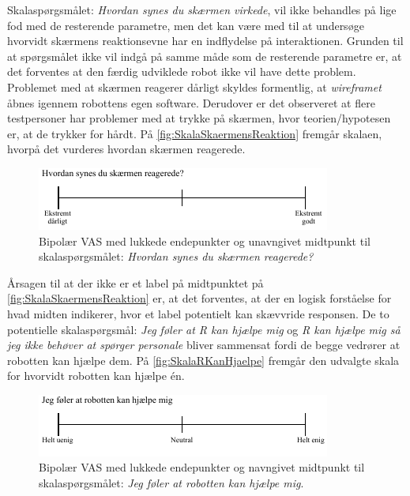 Skalaspørgsmålet: \textit{Hvordan synes du skærmen virkede}, vil ikke behandles på lige fod med de resterende parametre, men det kan være med til at undersøge hvorvidt skærmens reaktionsevne har en indflydelse på interaktionen. Grunden til at spørgsmålet ikke vil indgå på samme måde som de resterende parametre er, at det forventes at den færdig udviklede robot ikke vil have dette problem. Problemet med at skærmen reagerer dårligt skyldes formentlig, at \textit{wireframet} åbnes igennem robottens egen software. Derudover er det observeret at flere testpersoner har problemer med at trykke på skærmen, hvor teorien/hypotesen er, at de trykker for hårdt. På \autoref{fig:SkalaSkaermensReaktion} fremgår skalaen, hvorpå det vurderes hvordan skærmen reagerede.  
%
\begin{figure}[H]
\centering
\includegraphics[width =\textwidth]{Figure/UdvalgteSkalaer/SkaermensReaktion} 
\caption{Bipolær VAS med lukkede endepunkter og unavngivet midtpunkt til skalaspørgsmålet: \textit{Hvordan synes du skærmen reagerede?}}
\label{fig:SkalaSkaermensReaktion}
\end{figure}
\noindent
%
Årsagen til at der ikke er et label på midtpunktet på \autoref{fig:SkalaSkaermensReaktion} er, at det forventes, at der en logisk forståelse for hvad midten indikerer, hvor et label potentielt kan skævvride responsen. De to potentielle skalaspørgsmål: \textit{Jeg føler at R kan hjælpe mig} og \textit{R kan hjælpe mig så jeg ikke behøver at spørger personale} bliver sammensat fordi de begge vedrører at robotten kan hjælpe dem. På \autoref{fig:SkalaRKanHjaelpe} fremgår den udvalgte skala for hvorvidt robotten kan hjælpe én.
%
\begin{figure}[H]
\centering
\includegraphics[width =\textwidth]{Figure/UdvalgteSkalaer/RobottenKanHjaelpe} 
\caption{Bipolær VAS med lukkede endepunkter og navngivet midtpunkt til skalaspørgsmålet: \textit{Jeg føler at robotten kan hjælpe mig}.}
\label{fig:SkalaRKanHjaelpe}
\end{figure}
